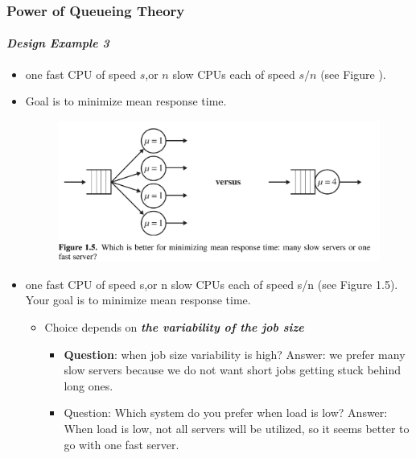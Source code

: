 \documentclass{beamer}
\begin{document}
\begin{frame}
    \frametitle{Power of Queueing Theory}
    \framesubtitle{\textbf{\textit{Design Example 3}}}
	\begin{itemize}
		\item one fast CPU of speed $s$,or $n$ slow CPUs each of speed $s/n$ (see Figure ). 
		\item Goal is to minimize mean response time. 
			\begin{figure}
        		\begin{center}
		            \includegraphics[scale=0.12]{images/onevsmanymachine.jpg}
        		\end{center}
		    \end{figure}
		\item one fast CPU of speed s,or n slow CPUs each of speed s/n (see Figure 1.5). Your goal 			is to minimize mean response time. 
		
		\begin{itemize}
			\item Choice depends on \textbf{\textit{the variability of the job size }}
		
		 
			\begin{itemize}
				\item \textbf{Question}: when job size variability is high?
					Answer:  we prefer many slow servers because we do not want short jobs getting 								stuck behind long ones.
				\item Question: Which system do you prefer when load is low?
				Answer: When load is low, not all servers will be utilized, so it seems better to 						go with one fast server.
			\end{itemize}
		\end{itemize}
	\end{itemize}	    
    
\end{frame}
\end{document}
